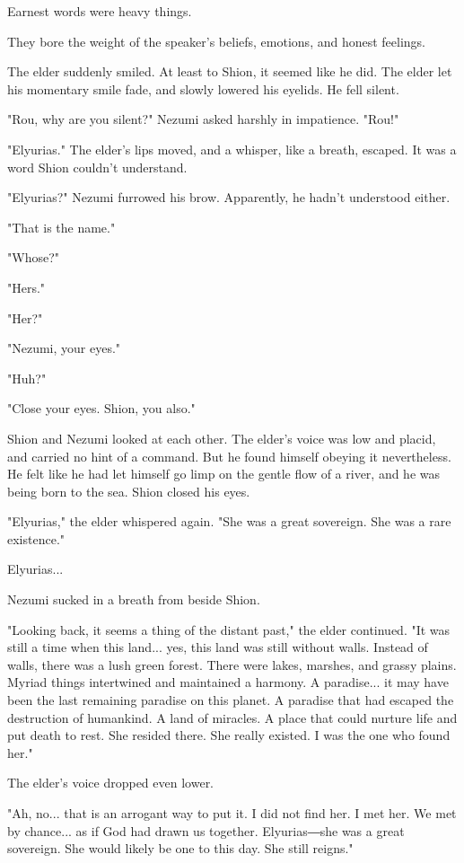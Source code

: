 Earnest words were heavy things.

They bore the weight of the speaker's beliefs, emotions, and honest
feelings.

The elder suddenly smiled. At least to Shion, it seemed like he did. The
elder let his momentary smile fade, and slowly lowered his eyelids. He
fell silent.

"Rou, why are you silent?" Nezumi asked harshly in impatience. "Rou!"

"Elyurias." The elder's lips moved, and a whisper, like a breath,
escaped. It was a word Shion couldn't understand.

"Elyurias?" Nezumi furrowed his brow. Apparently, he hadn't understood
either.

"That is the name."

"Whose?"

"Hers."

"Her?"

"Nezumi, your eyes."

"Huh?"

"Close your eyes. Shion, you also."

Shion and Nezumi looked at each other. The elder's voice was low and
placid, and carried no hint of a command. But he found himself obeying
it nevertheless. He felt like he had let himself go limp on the gentle
flow of a river, and he was being born to the sea. Shion closed his
eyes.

"Elyurias," the elder whispered again. "She was a great sovereign. She
was a rare existence."

Elyurias...

Nezumi sucked in a breath from beside Shion.

"Looking back, it seems a thing of the distant past," the elder
continued. "It was still a time when this land... yes, this land was
still without walls. Instead of walls, there was a lush green forest.
There were lakes, marshes, and grassy plains. Myriad things intertwined
and maintained a harmony. A paradise... it may have been the last
remaining paradise on this planet. A paradise that had escaped the
destruction of humankind. A land of miracles. A place that could nurture
life and put death to rest. She resided there. She really existed. I was
the one who found her."

The elder's voice dropped even lower.

"Ah, no... that is an arrogant way to put it. I did not find her. I met
her. We met by chance... as if God had drawn us together. Elyurias―she
was a great sovereign. She would likely be one to this day. She still
reigns."

